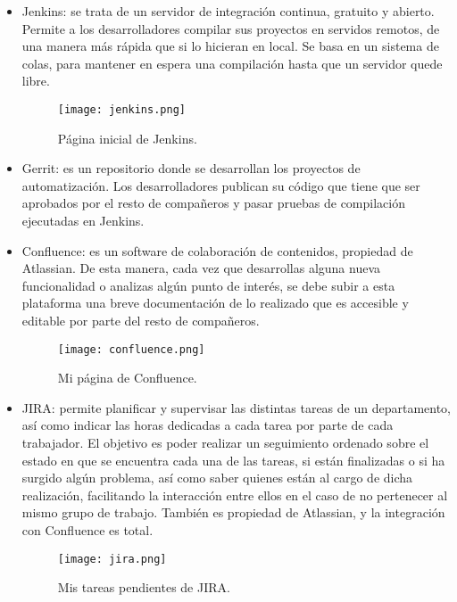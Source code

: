 \begin{itemize}
	\item{Jenkins: se trata de un servidor de integración continua, gratuito y abierto. Permite a los desarrolladores compilar sus proyectos en servidos remotos, de una manera más rápida que si lo hicieran en local. Se basa en un sistema de colas, para mantener en espera una compilación hasta que un servidor quede libre.}
	\begin{figure}[H]
		\centering
		\texttt{[image: jenkins.png]}
		\caption{Página inicial de Jenkins.}
		\label{fig:jenkins}
	\end{figure}	
	\item{Gerrit: es un repositorio donde se desarrollan los proyectos de automatización. Los desarrolladores publican su código que tiene que ser aprobados por el resto de compañeros y pasar pruebas de compilación ejecutadas en Jenkins.}	
	\item{Confluence: es un software de colaboración de contenidos, propiedad de Atlassian. De esta manera, cada vez que desarrollas alguna nueva funcionalidad o analizas algún punto de interés, se debe subir a esta plataforma una breve documentación de lo realizado que es accesible y editable por parte del resto de compañeros.}
	\begin{figure}[H]
		\centering
		\texttt{[image: confluence.png]}
		\caption{Mi página de Confluence.}
		\label{fig:confluence}
	\end{figure}	
	\item{JIRA: permite planificar y supervisar las distintas tareas de un departamento, así como indicar las horas dedicadas a cada tarea por parte de cada trabajador. El objetivo es poder realizar un seguimiento ordenado sobre el estado en que se encuentra cada una de las tareas, si están finalizadas o si ha surgido algún problema, así como saber quienes están al cargo de dicha realización, facilitando la interacción entre ellos en el caso de no pertenecer al mismo grupo de trabajo. También es propiedad de Atlassian, y la integración con Confluence es total.}
	\begin{figure}[H]
		\centering
		\texttt{[image: jira.png]}
		\caption{Mis tareas pendientes de JIRA.}
		\label{fig:jira}
	\end{figure}	
\end{itemize}





